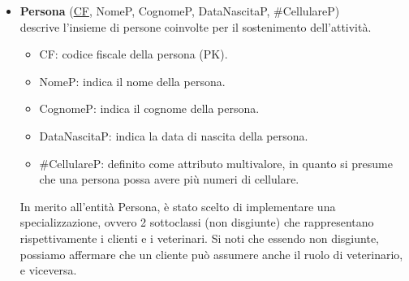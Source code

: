 \documentclass[12pt]{report}
\begin{document}
\begin{itemize}

\item \textbf{Persona} (\underline{CF}, NomeP, CognomeP, DataNascitaP, \#CellulareP) \\
descrive l'insieme di persone coinvolte per il sostenimento dell'attività.
\begin{itemize}
	\item CF: codice fiscale della persona (PK).
	\item NomeP: indica il nome della persona.
	\item CognomeP: indica il cognome della persona.
	\item DataNascitaP: indica la data di nascita della persona.
	\item \#CellulareP: definito come attributo multivalore, in quanto si presume che una persona possa avere più numeri di cellulare.
\end{itemize}
In merito all'entità Persona, è stato scelto di implementare una specializzazione, ovvero 2 sottoclassi (non disgiunte) che rappresentano rispettivamente i clienti e i veterinari. Si noti che essendo non disgiunte, possiamo affermare che un cliente può assumere anche il ruolo di veterinario, e viceversa.



\end{itemize}
\end{document}
